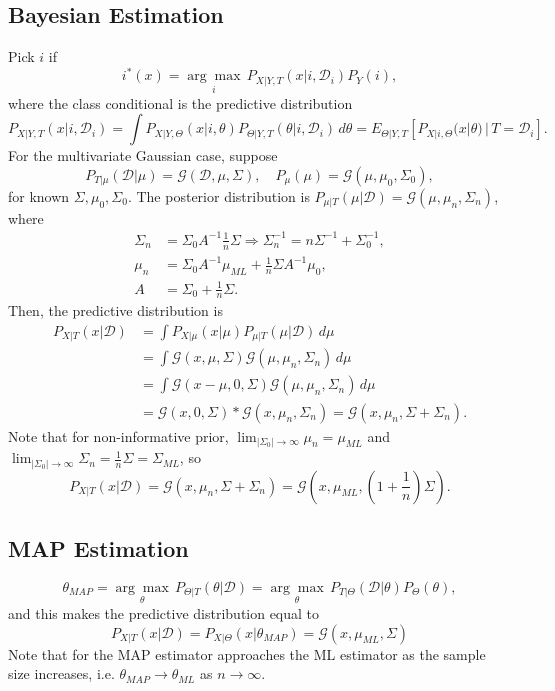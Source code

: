 \documentclass{article}
\newenvironment{topic}[1]{\subsection*{#1}}{}
\newcommand*{\G}{\mathcal{G}}
\newcommand*{\D}{\mathcal{D}}
\begin{document}
\begin{topic}{Bayesian Estimation}
    Pick $i$ if
    \[
        i^{*}(x) = \underset{i}{\arg \max} \, P_{X|Y, T}(x|i, \D_i)P_Y(i),
    \]
    where the class conditional is the predictive distribution
    \[
        P_{X|Y, T}(x|i, \D_i) = \int P_{X|Y, \Theta}(x|i, \theta)P_{\Theta|Y, T}(\theta|i, \D_i) \, d\theta = E_{\Theta|Y, T}[P_{X|i, \Theta}(x|\theta) \, | \, T = \D_i].
    \]
    For the multivariate Gaussian case, suppose
    \[
        P_{T|\mu}(\D|\mu) = \G(\D, \mu, \Sigma), \quad P_{\mu}(\mu) = \G(\mu, \mu_0, \Sigma_0),
    \]
    for known $\Sigma, \mu_0, \Sigma_0$. The posterior distribution is $P_{\mu|T}(\mu|\D) = \G(\mu, \mu_n, \Sigma_n)$, where 
    \begin{align*}
        \Sigma_n &= \Sigma_0A^{-1}\frac{1}{n}\Sigma \Rightarrow \Sigma_n^{-1} = n\Sigma^{-1} + \Sigma_0^{-1}, \\
        \mu_n &= \Sigma_0A^{-1}\mu_{ML} + \frac{1}{n}\Sigma A^{-1}\mu_0, \\
        A &= \Sigma_0 + \frac{1}{n}\Sigma.
    \end{align*}
    Then, the predictive distribution is
    \begin{align*}
        P_{X|T}(x|\D)
        &= \int P_{X|\mu}(x|\mu)P_{\mu|T}(\mu|\D) \, d\mu \\
        &= \int \G(x, \mu, \Sigma)\G(\mu, \mu_n, \Sigma_n) \, d\mu \\
        &= \int \G(x - \mu, 0, \Sigma)\G(\mu, \mu_n, \Sigma_n) \, d\mu \\
        &= \G(x, 0, \Sigma) * \G(x, \mu_n, \Sigma_n) = \G(x, \mu_n, \Sigma + \Sigma_n).
    \end{align*}
    Note that for non-informative prior,
    $\displaystyle{\lim_{|\Sigma_0| \to \infty}} \mu_n = \mu_{ML}$ and $\displaystyle{\lim_{|\Sigma_0| \to \infty}} \Sigma_n = \frac{1}{n}\Sigma = \Sigma_{ML}$, so
    \[
        P_{X|T}(x|\D) = \G(x, \mu_n, \Sigma + \Sigma_n) = \G\left(x, \mu_{ML}, \left(1 + \frac{1}{n}\right)\Sigma\right).
    \]
\end{topic}

\begin{topic}{MAP Estimation}
    \[
        \theta_{MAP} = \underset{\theta}{\arg \max} \, P_{\Theta|T}(\theta|\D) = \underset{\theta}{\arg \max} \, P_{T|\Theta}(\D|\theta)P_{\Theta}(\theta),
    \]
    and this makes the predictive distribution equal to
    \[
        P_{X|T}(x|\D) = P_{X|\Theta}(x|\theta_{MAP}) = \G(x, \mu_{ML}, \Sigma)
    \]
    Note that for the MAP estimator approaches the ML estimator as the sample size increases, i.e. $\theta_{MAP} \rightarrow \theta_{ML}$ as $n \rightarrow \infty$.
\end{topic}
\end{document}
